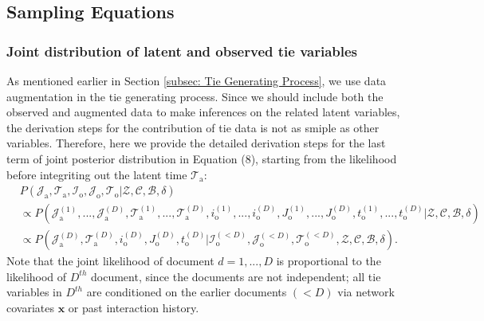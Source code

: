 \documentclass[a4paper]{article}
\begin{document}
  	  \subsection{Sampling Equations}\label{subsec:Sampling Equations}
  	     \subsubsection{Joint distribution of latent and observed tie variables}\label{subsubsec:Joint distribution of Tie}
  	       As mentioned earlier in Section \ref{subsec: Tie Generating Process}, we use data augmentation in the tie generating process. Since we should include both the observed and augmented data to make inferences on the related latent variables, the derivation steps for the contribution of tie data is not as smiple as other variables. Therefore, here we provide the detailed derivation steps for the last term of joint posterior distribution in Equation (8), starting from the likelihood before integriting out the latent time $\mathcal{T}_{\mbox{a}}$: 
  	       \begin{equation}
  	       \begin{aligned}
  	       &P(\mathcal{J}_{\mbox{a}}, \mathcal{T}_{\mbox{a}},\mathcal{I}_{\mbox{o}}, \mathcal{J}_{\mbox{o}}, \mathcal{T}_{\mbox{o}} |\mathcal{Z}, \mathcal{C}, \mathcal{B}, \delta)
  	       \\& \propto P(\mathcal{J}^{(1)}_{\mbox{a}}, ...,\mathcal{J}^{(D)}_{\mbox{a}}, \mathcal{T}^{(1)}_{\mbox{a}},...,\mathcal{T}^{(D)}_{\mbox{a}}, i^{(1)}_{\mbox{o}},...,i^{(D)}_{\mbox{o}}, J^{(1)}_{\mbox{o}},...,J^{(D)}_{\mbox{o}}, t^{(1)}_{\mbox{o}},...,t^{(D)}_{\mbox{o}} |\mathcal{Z}, \mathcal{C}, \mathcal{B}, \delta)
  	       \\& \propto P(\mathcal{J}^{(D)}_{\mbox{a}}, \mathcal{T}^{(D)}_{\mbox{a}}, i^{(D)}_{\mbox{o}}, J^{(D)}_{\mbox{o}}, t^{(D)}_{\mbox{o}} |\mathcal{I}^{(<D)}_{\mbox{o}}, \mathcal{J}^{(<D)}_{\mbox{o}}, \mathcal{T}^{(<D)}_{\mbox{o}},\mathcal{Z}, \mathcal{C}, \mathcal{B}, \delta).
  	       \end{aligned}
  	       \end{equation}
  	       Note that the joint likelihood of document $d=1,...,D$ is proportional to the likelihood of $D^{th}$ document, since the documents are not independent; all tie variables in $D^{th}$ are conditioned on the earlier documents $(<D)$ via network covariates $\boldsymbol{x}$ or past interaction history. \\ \newline
\end{document}
